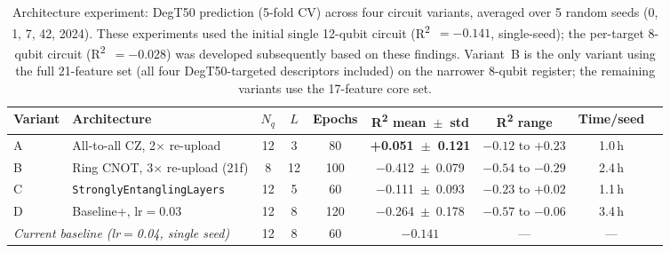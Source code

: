 \documentclass[12pt,a4paper]{article}
\newcommand{\rtwo}{R\textsuperscript{2}}
\begin{document}
\begin{table}[htbp]
  \centering
  \caption{Architecture experiment: DegT50 prediction (5-fold CV) across
           four circuit variants, averaged over 5 random seeds
           (0, 1, 7, 42, 2024). These experiments used the initial single
           12-qubit circuit (\rtwo{}~$= -0.141$, single-seed); the
           per-target 8-qubit circuit (\rtwo{}~$= -0.028$) was developed
           subsequently based on these findings. Variant~B is the only
           variant using the full 21-feature set (all four DegT50-targeted
           descriptors included) on the narrower 8-qubit register; the
           remaining variants use the 17-feature core set.}
  \label{tab:arch}
  \small
  \begin{tabular}{llccccccc}
    \toprule
    \textbf{Variant} & \textbf{Architecture} & \textbf{$N_q$} &
      \textbf{$L$} & \textbf{Epochs} &
      \textbf{\rtwo{} mean~$\pm$~std} & \textbf{\rtwo{} range} & \textbf{Time/seed} \\
    \midrule
    A & All-to-all CZ, 2$\times$ re-upload      & 12 & 3  & 80  & \textbf{+0.051~$\pm$~0.121} & $-0.12$ to $+0.23$ & 1.0\,h \\
    B & Ring CNOT, 3$\times$ re-upload (21f)    &  8 & 12 & 100 & $-$0.412~$\pm$~0.079 & $-0.54$ to $-0.29$ & 2.4\,h \\
    C & \texttt{StronglyEntanglingLayers}       & 12 & 5  & 60  & $-$0.111~$\pm$~0.093 & $-0.23$ to $+0.02$ & 1.1\,h \\
    D & Baseline+, lr$=$0.03                    & 12 & 8  & 120 & $-$0.264~$\pm$~0.178 & $-0.57$ to $-0.06$ & 3.4\,h \\
    \midrule
    \multicolumn{2}{l}{\emph{Current baseline (lr$=$0.04, single seed)}} & 12 & 8 & 60
      & $-0.141$ & --- & --- \\
    \bottomrule
  \end{tabular}
\end{table}
\end{document}
